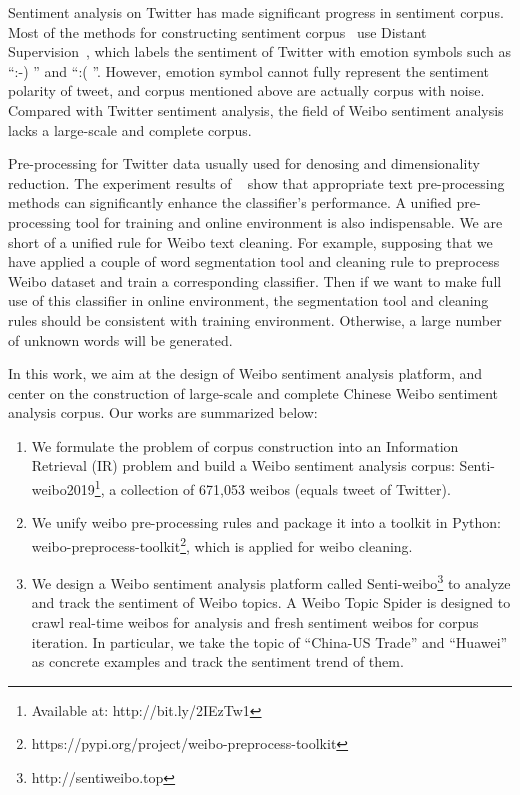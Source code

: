 \documentclass[runningheads]{llncs}
\begin{document}
Sentiment analysis on Twitter has made significant progress in sentiment corpus. Most of the methods for constructing sentiment corpus~\cite{iosifidis2017large} use Distant Supervision~\cite{go2009twitter}, which labels the sentiment of Twitter with emotion symbols such as ``:-) '' and ``:( ''. However, emotion symbol cannot fully represent the sentiment polarity of tweet, and corpus mentioned above are actually corpus with noise. Compared with Twitter sentiment analysis, the field of Weibo sentiment analysis lacks a large-scale and complete corpus.

Pre-processing for Twitter data usually used for denosing and dimensionality reduction. The experiment results of ~\cite{haddi2013role} show that appropriate text pre-processing methods can significantly enhance the classifier's performance. A unified pre-processing tool for training and online environment is also indispensable. We are short of a unified rule for Weibo text cleaning. For example, supposing that we have applied a couple of word segmentation tool and cleaning rule to preprocess Weibo dataset and train a corresponding classifier. Then if we want to make full use of this classifier in online environment, the segmentation tool and cleaning rules should be consistent with training environment. Otherwise, a large number of unknown words will be generated.

In this work, we aim at the design of Weibo sentiment analysis platform, and center on the construction of large-scale and complete Chinese Weibo sentiment analysis corpus. Our works are summarized below:

\begin{enumerate}
\item We formulate the problem of corpus construction into an Information Retrieval (IR) problem and build a Weibo sentiment analysis corpus: Senti-weibo2019\footnote{Available at: http://bit.ly/2IEzTw1}, a collection of 671,053 weibos (equals tweet of Twitter).

\item We unify weibo pre-processing rules and package it into a toolkit in Python: weibo-preprocess-toolkit\footnote{https://pypi.org/project/weibo-preprocess-toolkit}, which is applied for weibo cleaning. 

\item We design a Weibo sentiment analysis platform called Senti-weibo\footnote{http://sentiweibo.top} to analyze and track the sentiment of Weibo topics. A Weibo Topic Spider is designed to crawl real-time weibos for analysis and fresh sentiment weibos for corpus iteration. In particular, we take the topic of ``China-US Trade'' and ``Huawei'' as concrete examples and track the sentiment trend of them.
\end{enumerate}
\end{document}
